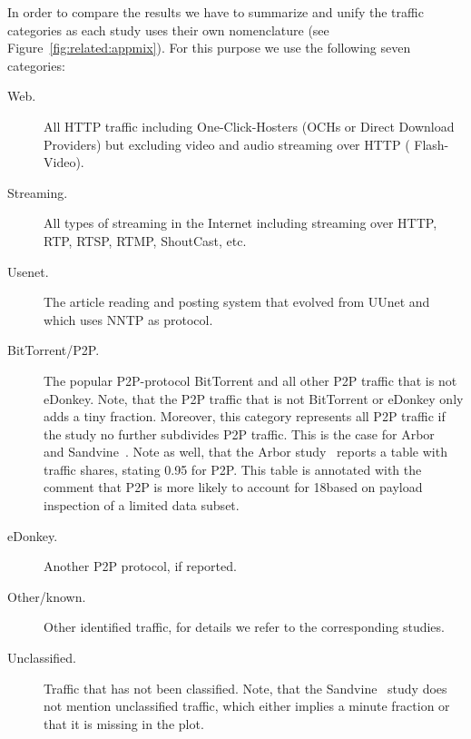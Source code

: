 In order to compare the results we have to summarize and unify the traffic
categories as each study uses their own nomenclature (see
Figure~\ref{fig:related:appmix}). For this purpose we use the following seven
categories:

\begin{description}

\item [Web.] All HTTP traffic including One-Click-Hosters (OCHs or Direct
Download Providers) but excluding video and audio streaming over HTTP (\ie
Flash-Video).

\item [Streaming.] All types of streaming in the Internet including streaming
over HTTP, RTP, RTSP, RTMP, ShoutCast, etc.

\item [Usenet.] The article reading and posting system that evolved from UUnet
and which uses NNTP as protocol.

\item [BitTorrent/P2P.] The popular P2P-protocol BitTorrent and all other P2P
traffic that is not eDonkey. Note, that the P2P traffic that is not BitTorrent
or eDonkey only adds a tiny fraction.  Moreover, this category represents all
P2P traffic if the study no further subdivides P2P traffic. This is the case
for Arbor~\cite{arbor} and Sandvine~\cite{sandvine}. Note as well, that the
Arbor study~\cite{arbor} reports a table with traffic shares, stating 0.95\perc
for P2P. This table is annotated with the comment that P2P is more likely to
account for 18\perc based on payload inspection of a limited data subset.

\item [eDonkey.] Another P2P protocol, if reported.

\item [Other/known.] Other identified traffic, for details we refer to the
corresponding studies.

\item [Unclassified.] Traffic that has not been classified. Note, that the
Sandvine~\cite{sandvine} study does not mention unclassified traffic, which
either implies a minute fraction or that it is missing in the plot.

\end{description}

